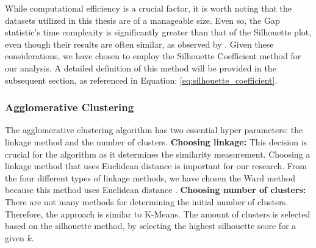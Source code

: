 While computational efficiency is a crucial factor, it is worth noting that the datasets utilized in this thesis are of a manageable size.
Even so, the Gap statistic's time complexity is significantly greater than that of the Silhouette plot, even though their results are often similar, as observed by \citep{yuan_research_2019}.
Given these considerations, we have chosen to employ the Silhouette Coefficient method for our analysis. A detailed definition of this method will be provided in the subsequent section, as referenced in Equation: \ref{eq:silhouette_coefficient}.

\subsubsection{Agglomerative Clustering} \label{theory:clustering-agglomerative}
The agglomerative clustering algorithm has two essential hyper parameters: the linkage method and the number of clusters. \newline
\textbf{Choosing linkage:}
This decision is crucial for the algorithm as it determines the similarity measurement.
Choosing a linkage method that uses Euclidean distance is important for our research.
From the four different types of linkage methods, we have chosen the Ward method because this method uses Euclidean distance \citep{roux_comparative_2015,seetharaman_brief_2019}. \newline
\textbf{Choosing number of clusters:}
There are not many methods for determining the initial number of clusters.
Therefore, the approach is similar to K-Means.
The amount of clusters is selected based on the silhouette method, by selecting the highest silhouette score for a given $k$.


